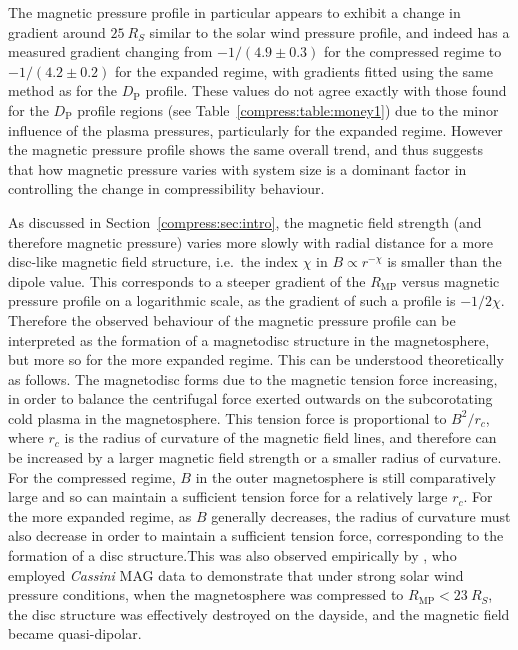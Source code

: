 The magnetic pressure profile in particular appears to exhibit a change in gradient around $\SI{25}{R_S}$ similar to the solar wind pressure profile, and indeed has a measured gradient changing from $-1/(4.9 \pm 0.3)$ for the compressed regime to $ -1/(4.2 \pm 0.2)$ for the expanded regime, with gradients fitted using the same method as for the $D_\mathrm{P}$ profile. These values do not agree exactly with those found for the $D_\mathrm{P}$ profile regions (see Table~\ref{compress:table:money1}) due to the minor influence of the plasma pressures, particularly for the expanded regime. However the magnetic pressure profile shows the same overall trend, and thus suggests that how magnetic pressure varies with system size is a dominant factor in controlling the change in compressibility behaviour.
 
As discussed in Section~\ref{compress:sec:intro}, the magnetic field strength (and therefore magnetic pressure) varies more slowly with radial distance for a more disc-like magnetic field structure, i.e.\ the index $\chi$ in $B \propto r^{-\chi}$ is smaller than the dipole value. This corresponds to a steeper gradient of the $R_\mathrm{MP}$ versus magnetic pressure profile on a logarithmic scale, as the gradient of such a profile is $-1/2\chi$. Therefore the observed behaviour of the magnetic pressure profile can be interpreted as the formation of a magnetodisc structure in the magnetosphere, but more so for the more expanded regime. This can be understood theoretically as follows. The magnetodisc forms due to the magnetic tension force increasing, in order to balance the centrifugal force exerted outwards on the subcorotating cold plasma in the magnetosphere. This tension force is proportional to $B^2/r_c$, where $r_c$ is the radius of curvature of the magnetic field lines, and therefore can be increased by a larger magnetic field strength or a smaller radius of curvature. For the compressed regime, $B$ in the outer magnetosphere is still comparatively large and so can maintain a sufficient tension force for a relatively large $r_c$. For the more expanded regime, as $B$ generally decreases, the radius of curvature must also decrease in order to maintain a sufficient tension force, corresponding to the formation of a disc structure.This was also observed empirically by \citet{arridge2008}, who employed \textit{Cassini} MAG data to demonstrate that under strong solar wind pressure conditions, when the magnetosphere was compressed to $R_\mathrm{MP} < \SI{23}{R_S}$, the disc structure was effectively destroyed on the dayside, and the magnetic field became quasi-dipolar.

